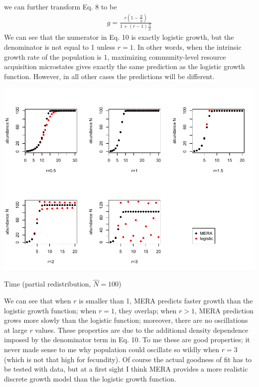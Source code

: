 \documentclass[12pt]{article}
\begin{document}
we can further transform Eq. 8 to be
  \begin{equation}
 \begin{split}
g =  \frac{r (1 - \frac{N}{\hat {N}})}{1 + (r-1) \frac{N}{\hat {N}}}
\end{split}
\end{equation}
We can see that the numerator in Eq. 10 is exactly logistic growth, but the denominator is not equal to 1 unless $r=1$. In other words, when the intrinsic growth rate of the population is 1, maximizing community-level resource acquisition microstates gives exactly the same prediction as the logistic growth function. However, in all other cases the predictions will be different.

\includegraphics[width=\textwidth]{partial_result.pdf}

\begin{center}
Time (partial redistribution, $\hat {N} =100$)
\end{center}

We can see that when $r$ is smaller than 1, MERA predicts faster growth than the logistic growth function; when $r=1$, they overlap; when $r>1$, MERA prediction grows more slowly than the logistic function; moreover, there are no oscillations at large $r$ values. These properties are due to the additional density dependence imposed by the denominator term in Eq. 10. To me these are good properties; it never made sense to me why population could oscillate so wildly when $r=3$ (which is not that high for fecundity). Of course the actual goodness of fit has to be tested with data, but at a first sight I think MERA provides a more realistic discrete growth model than the logistic growth function.
  
\end{document}
